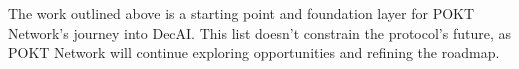 \documentclass[conference,compsoc]{IEEEtran}
\begin{document}
The work outlined above is a starting point and foundation layer for POKT Network's journey into DecAI. This list doesn't constrain the protocol's future, as POKT Network will continue exploring opportunities and refining the roadmap.













%
%



%
%
\end{document}
